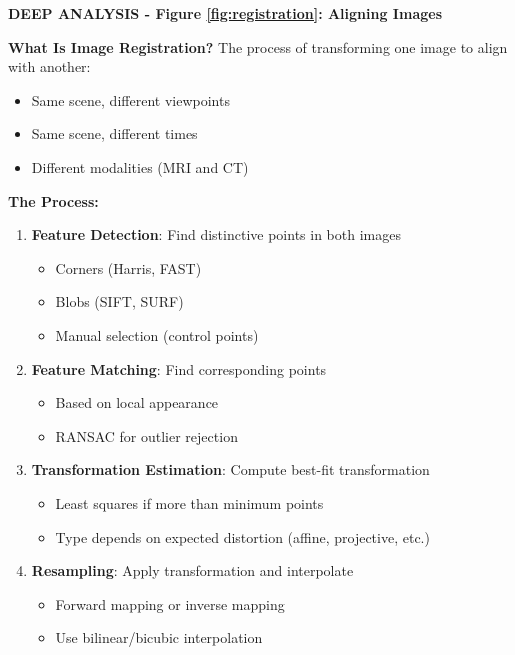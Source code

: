 \documentclass[12pt,a4paper]{article}
\begin{document}
\begin{deepexplanation}
\textbf{DEEP ANALYSIS - Figure \ref{fig:registration}: Aligning Images}

\textbf{What Is Image Registration?}
The process of transforming one image to align with another:
\begin{itemize}
    \item Same scene, different viewpoints
    \item Same scene, different times
    \item Different modalities (MRI and CT)
\end{itemize}

\textbf{The Process:}
\begin{enumerate}
    \item \textbf{Feature Detection}: Find distinctive points in both images
    \begin{itemize}
        \item Corners (Harris, FAST)
        \item Blobs (SIFT, SURF)
        \item Manual selection (control points)
    \end{itemize}
    
    \item \textbf{Feature Matching}: Find corresponding points
    \begin{itemize}
        \item Based on local appearance
        \item RANSAC for outlier rejection
    \end{itemize}
    
    \item \textbf{Transformation Estimation}: Compute best-fit transformation
    \begin{itemize}
        \item Least squares if more than minimum points
        \item Type depends on expected distortion (affine, projective, etc.)
    \end{itemize}
    
    \item \textbf{Resampling}: Apply transformation and interpolate
    \begin{itemize}
        \item Forward mapping or inverse mapping
        \item Use bilinear/bicubic interpolation
    \end{itemize}
\end{enumerate}


\end{deepexplanation}
\end{document}
